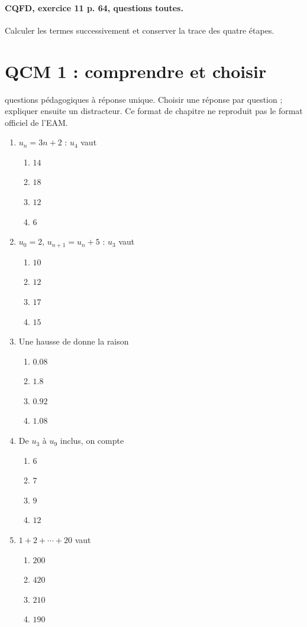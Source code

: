 \paragraph{CQFD, exercice 11 p. 64, questions toutes.}\label{C01-M2} Calculer les termes successivement et conserver la trace des quatre étapes.
\begingroup\small
\mxnewpage\section*{QCM 1 : comprendre et choisir}\label{C01-Q1}
 questions pédagogiques à réponse unique. Choisir une réponse par question ; expliquer ensuite un distracteur. Ce format de chapitre ne reproduit pas le format officiel de l’EAM.
\begin{enumerate}
\item $u_n=3n+2$ : $u_4$ vaut
\begin{enumerate}[label=\Alph*.,itemsep=2pt]
\item $14$
\item $18$
\item $12$
\item $6$
\end{enumerate}
\item $u_0=2$, $u_{n+1}=u_n+5$ : $u_3$ vaut
\begin{enumerate}[label=\Alph*.,itemsep=2pt]
\item $10$
\item $12$
\item $17$
\item $15$
\end{enumerate}
\item Une hausse de  donne la raison
\begin{enumerate}[label=\Alph*.,itemsep=2pt]
\item $\num{0,08}$
\item $\num{1,8}$
\item $\num{0,92}$
\item $\num{1,08}$
\end{enumerate}
\item De $u_3$ à $u_9$ inclus, on compte
\begin{enumerate}[label=\Alph*.,itemsep=2pt]
\item $6$
\item $7$
\item $9$
\item $12$
\end{enumerate}
\item $1+2+\cdots+20$ vaut
\begin{enumerate}[label=\Alph*.,itemsep=2pt]
\item $200$
\item $420$
\item $210$
\item $190$
\end{enumerate}
\end{enumerate}
